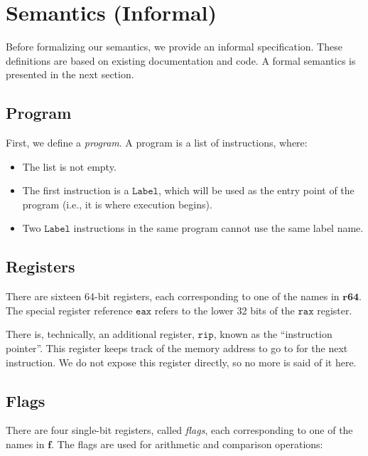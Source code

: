 \documentclass{article}
\newcommand{\nonterm}[1]{\ensuremath{\mathbf{#1}}}
\newcommand{\term}[1]{\ensuremath{\mathtt{#1}}}
\begin{document}
\section{Semantics (Informal)}

Before formalizing our semantics, we provide an informal specification. These
definitions are based on existing documentation and code. A formal semantics is
presented in the next section.  %

\subsection{Program}

First, we define a \emph{program}. A program is a list of instructions, where:

\begin{itemize}
\item The list is not empty.
\item The first instruction is a \term{Label}, which will be used as the entry
  point of the program (i.e., it is where execution begins).
\item Two \term{Label} instructions in the same program cannot use the same
  label name.
\end{itemize}

\subsection{Registers}

There are sixteen 64-bit registers, each corresponding to one of the names in
\nonterm{r64}. The special register reference \term{eax} refers to the lower 32
bits of the \term{rax} register.

There is, technically, an additional register, \term{rip}, known as the
``instruction pointer''. This register keeps track of the memory address to go
to for the next instruction. We do not expose this register directly, so no more
is said of it here.

\subsection{Flags}

There are four single-bit registers, called \emph{flags}, each corresponding to
one of the names in \nonterm{f}. The flags are used for arithmetic and
comparison operations:
\end{document}
